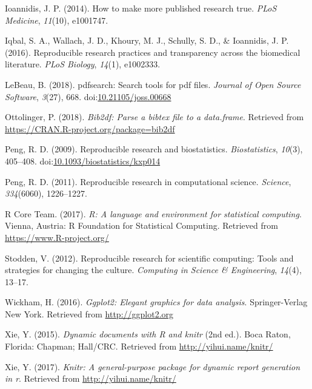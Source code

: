 \documentclass[english,,man]{apa6}
\theoremstyle{definition}
\theoremstyle{definition}
\theoremstyle{definition}
\theoremstyle{remark}
\begin{document}
\leavevmode\hypertarget{ref-ioannidis2014}{}%
Ioannidis, J. P. (2014). How to make more published research true.
\emph{PLoS Medicine}, \emph{11}(10), e1001747.

\leavevmode\hypertarget{ref-iqbal2016}{}%
Iqbal, S. A., Wallach, J. D., Khoury, M. J., Schully, S. D., \&
Ioannidis, J. P. (2016). Reproducible research practices and
transparency across the biomedical literature. \emph{PLoS Biology},
\emph{14}(1), e1002333.

\leavevmode\hypertarget{ref-pdfsearch}{}%
LeBeau, B. (2018). pdfsearch: Search tools for pdf files. \emph{Journal
of Open Source Software}, \emph{3}(27), 668.
doi:\href{https://doi.org/10.21105/joss.00668}{10.21105/joss.00668}

\leavevmode\hypertarget{ref-bib2df}{}%
Ottolinger, P. (2018). \emph{Bib2df: Parse a bibtex file to a
data.frame}. Retrieved from
\url{https://CRAN.R-project.org/package=bib2df}

\leavevmode\hypertarget{ref-peng2009}{}%
Peng, R. D. (2009). Reproducible research and biostatistics.
\emph{Biostatistics}, \emph{10}(3), 405--408.
doi:\href{https://doi.org/10.1093/biostatistics/kxp014}{10.1093/biostatistics/kxp014}

\leavevmode\hypertarget{ref-peng2011}{}%
Peng, R. D. (2011). Reproducible research in computational science.
\emph{Science}, \emph{334}(6060), 1226--1227.

\leavevmode\hypertarget{ref-rpro}{}%
R Core Team. (2017). \emph{R: A language and environment for statistical
computing}. Vienna, Austria: R Foundation for Statistical Computing.
Retrieved from \url{https://www.R-project.org/}

\leavevmode\hypertarget{ref-stodden2012}{}%
Stodden, V. (2012). Reproducible research for scientific computing:
Tools and strategies for changing the culture. \emph{Computing in
Science \& Engineering}, \emph{14}(4), 13--17.

\leavevmode\hypertarget{ref-ggplot2}{}%
Wickham, H. (2016). \emph{Ggplot2: Elegant graphics for data analysis}.
Springer-Verlag New York. Retrieved from \url{http://ggplot2.org}

\leavevmode\hypertarget{ref-knitr}{}%
Xie, Y. (2015). \emph{Dynamic documents with R and knitr} (2nd ed.).
Boca Raton, Florida: Chapman; Hall/CRC. Retrieved from
\url{http://yihui.name/knitr/}

\leavevmode\hypertarget{ref-knitrmanual}{}%
Xie, Y. (2017). \emph{Knitr: A general-purpose package for dynamic
report generation in r}. Retrieved from \url{http://yihui.name/knitr/}
\end{document}
